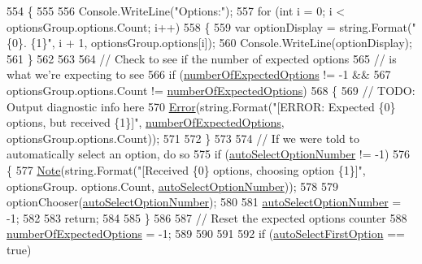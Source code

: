 \begin{DoxyCode}
554             \{
555 
556                 Console.WriteLine(\textcolor{stringliteral}{"Options:"});
557                 \textcolor{keywordflow}{for} (\textcolor{keywordtype}{int} i = 0; i < optionsGroup.options.Count; i++)
558                 \{
559                     var optionDisplay = string.Format(\textcolor{stringliteral}{"\{0\}. \{1\}"}, i + 1, optionsGroup.options[i]);
560                     Console.WriteLine(optionDisplay);
561                 \}
562 
563 
564                 \textcolor{comment}{// Check to see if the number of expected options}
565                 \textcolor{comment}{// is what we're expecting to see}
566                 \textcolor{keywordflow}{if} (\hyperlink{a00046_a2e17937195ecd64d5d867d958c45d2c3}{numberOfExpectedOptions} != -1 &&
567                     optionsGroup.options.Count != \hyperlink{a00046_a2e17937195ecd64d5d867d958c45d2c3}{numberOfExpectedOptions})
568                 \{
569                     \textcolor{comment}{// TODO: Output diagnostic info here}
570                     \hyperlink{a00185_a2f63f9f5b7634cb50ee75ff2eb18b137}{Error}(\textcolor{keywordtype}{string}.Format(\textcolor{stringliteral}{"[ERROR: Expected \{0\} options, but received \{1\}]"}, 
      \hyperlink{a00046_a2e17937195ecd64d5d867d958c45d2c3}{numberOfExpectedOptions}, optionsGroup.options.Count));
571 
572                 \}
573 
574                 \textcolor{comment}{// If we were told to automatically select an option, do so}
575                 \textcolor{keywordflow}{if} (\hyperlink{a00046_a34886671e91a1bf3fc225eeb67baced1}{autoSelectOptionNumber} != -1)
576                 \{
577                     \hyperlink{a00185_a939cc9e943c574b36c6af93e9c772702}{Note}(\textcolor{keywordtype}{string}.Format(\textcolor{stringliteral}{"[Received \{0\} options, choosing option \{1\}]"}, optionsGroup.
      options.Count, \hyperlink{a00046_a34886671e91a1bf3fc225eeb67baced1}{autoSelectOptionNumber}));
578 
579                     optionChooser(\hyperlink{a00046_a34886671e91a1bf3fc225eeb67baced1}{autoSelectOptionNumber});
580 
581                     \hyperlink{a00046_a34886671e91a1bf3fc225eeb67baced1}{autoSelectOptionNumber} = -1;
582 
583                     \textcolor{keywordflow}{return};
584 
585                 \}
586 
587                 \textcolor{comment}{// Reset the expected options counter}
588                 \hyperlink{a00046_a2e17937195ecd64d5d867d958c45d2c3}{numberOfExpectedOptions} = -1;
589 
590 
591 
592                 \textcolor{keywordflow}{if} (\hyperlink{a00046_a09a552ee9ff58cb3c995f8ecba1592b6}{autoSelectFirstOption} == \textcolor{keyword}{true})

\end{DoxyCode}
